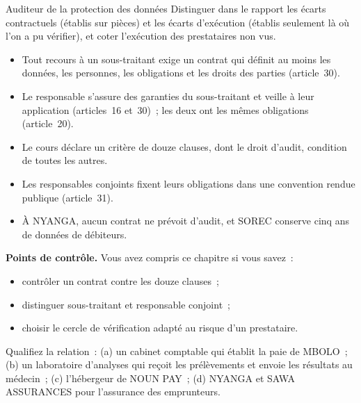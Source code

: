 \begin{boxmetier}{Auditeur de la protection des données}
Distinguer dans le rapport les écarts contractuels (établis sur pièces) et
les écarts d'exécution (établis seulement là où l'on a pu vérifier), et
coter \NEK{} l'exécution des prestataires non vus.
\end{boxmetier}

\begin{boxresume}
\begin{itemize}
    \item Tout recours à un sous-traitant exige un contrat qui définit au
          moins les données, les personnes, les obligations et les droits
          des parties (article~30).
    \item Le responsable s'assure des garanties du sous-traitant et veille à
          leur application (articles~16 et~30)~; les deux ont les mêmes
          obligations (article~20).
    \item Le cours déclare un critère de douze clauses, dont le droit
          d'audit, condition de toutes les autres.
    \item Les responsables conjoints fixent leurs obligations dans une
          convention rendue publique (article~31).
    \item À NYANGA, aucun contrat ne prévoit d'audit, et SOREC conserve cinq
          ans de données de débiteurs.
\end{itemize}
\end{boxresume}

\begin{boxinfo}
\textbf{Points de contrôle.} Vous avez compris ce chapitre si vous savez~:
\begin{itemize}
    \item contrôler un contrat contre les douze clauses~;
    \item distinguer sous-traitant et responsable conjoint~;
    \item choisir le cercle de vérification adapté au risque d'un
          prestataire.
\end{itemize}
\end{boxinfo}

\begin{boxexo}[title={\ding{45}\quad Exercice~13.1. Sous-traitant ou conjoint \niveaubase}]
Qualifiez la relation~: (a) un cabinet comptable qui établit la paie de
MBOLO~; (b) un laboratoire d'analyses qui reçoit les prélèvements et
envoie les résultats au médecin~; (c) l'hébergeur de NOUN PAY~; (d) NYANGA
et SAWA ASSURANCES pour l'assurance des emprunteurs.
\end{boxexo}

